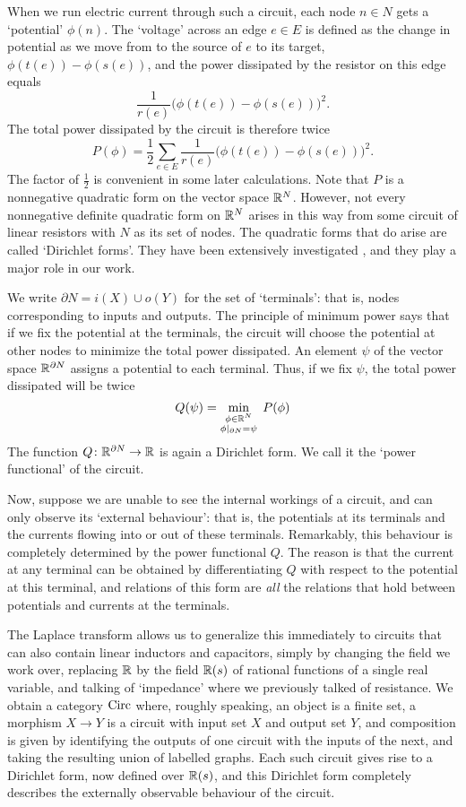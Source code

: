 When we run electric current through such a circuit, each node $n \in N$ gets
a `potential' $\phi(n)$.  The `voltage' across an edge $e \in E$ is defined as the 
change in potential as we move from to the source of $e$ to its target, $\phi(t(e)) - 
\phi(s(e))$, and the power dissipated by the resistor on this edge equals
\[      
\frac{1}{r(e)}\big(\phi(t(e))-\phi(s(e))\big)^2. 
\]
The total power dissipated by the circuit is therefore twice
\[   
P(\phi) = \frac{1}{2}\sum_{e \in E} \frac{1}{r(e)}\big(\phi(t(e))-\phi(s(e))\big)^2.
\]
The factor of $\frac{1}{2}$ is convenient in some later calculations.  
Note that $P$ is a nonnegative quadratic form on the vector space ${\mathbb{R}}^N$.
However, not every nonnegative definite quadratic form on ${\mathbb{R}}^N$ arises in this way from some circuit of linear resistors with $N$ as its set of nodes.  The quadratic forms that do arise are called `Dirichlet forms'.  They have been extensively investigated \cite{Fukushima,MR,Sabot1997,Sabot2004}, and they play a major role in our work.

We write $\partial N = i(X) \cup o(Y)$ for the set of `terminals': that is,
nodes corresponding to inputs and outputs.    The principle of minimum
power says that if we fix the potential at the terminals, the circuit will choose
the potential at other nodes to minimize the total power dissipated.   
An element $\psi$ of the vector space ${\mathbb{R}}^{\partial N}$ assigns a potential 
to each terminal.   Thus, if we fix $\psi$, the total power dissipated will be twice
\[
  Q(\psi) = \min_{\substack{ \phi \in {\mathbb{R}}^N \\ \phi\vert_{\partial N} = \psi}} \; P(\phi)  
\]
The function $Q {\colon} {\mathbb{R}}^{\partial N} \to {\mathbb{R}}$ is again a Dirichlet form.  We call it the `power functional' of the circuit.  

Now, suppose we are unable to see the internal workings of a circuit, and can only observe its `external behaviour': that is, the potentials at its terminals and the currents flowing into or out of these terminals.   Remarkably, this behaviour is completely determined by the power functional $Q$.  The reason is that the current at any terminal can be obtained by differentiating $Q$ with respect to the potential at this terminal, and relations of this form are \emph{all} the relations that hold between potentials and currents at the terminals.

The Laplace transform allows us to generalize this immediately to circuits that
can also contain linear inductors and capacitors, simply by changing the field we work over, replacing ${\mathbb{R}}$ by the field ${\mathbb{R}}(s)$ of rational functions of a single real variable,
and talking of `impedance' where we previously talked of resistance.  We obtain
a category $\mathrm{Circ}$ where, roughly speaking, an object is a finite set, a
morphism $X \to Y$ is a circuit with input set $X$ and output set $Y$, and
composition is given by identifying the outputs of one circuit with the inputs
of the next, and taking the resulting union of labelled graphs.  Each such circuit gives rise to a Dirichlet form, now defined over
${\mathbb{R}}(s)$, and this Dirichlet form completely describes the externally observable
behaviour of the circuit.  


